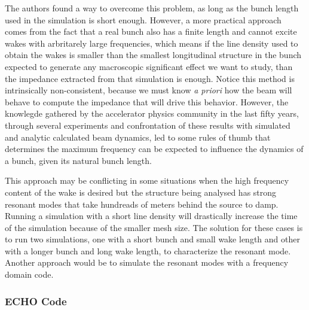     The authors  found a way to overcome this problem, as long as the bunch length used in the simulation is short enough. However, a more practical approach comes from the fact that a real bunch also has a finite length and cannot excite wakes with arbritarely large frequencies, which means if the line density used to obtain the wakes is smaller than the smallest longitudinal structure in the bunch expected to generate any macroscopic significant effect we want to study, than the impedance extracted from that simulation is enough. Notice this method is intrinsically non-consistent, because we must know \emph{a priori} how the beam will behave to compute the impedance that will drive this behavior. However, the knowlegde gathered by the accelerator physics community in the last fifty years, through several experiments and confrontation of these results with simulated and analytic calculated beam dynamics, led to some rules of thumb that determines the maximum frequency can be expected to influence the dynamics of a bunch, given its natural bunch length.

    This approach may be conflicting in some situations when the high frequency content of the wake is desired but the structure being analysed has strong resonant modes that take hundreads of meters behind the source to damp. Running a simulation with a short line density will drastically increase the time of the simulation because of the smaller mesh size. The solution for these cases is to run two simulations, one with a short bunch and small wake length and other with a longer bunch and long wake length, to characterize the resonant mode. Another approach would be to simulate the resonant modes with a frequency domain code.

\subsubsection{ECHO Code}

